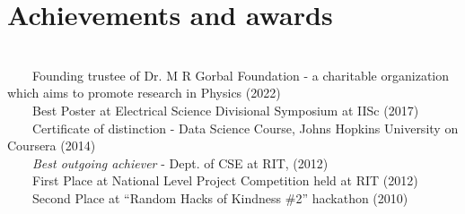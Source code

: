 \documentclass[a4paper,10pt]{article} %
\newcommand{\tabitem}{~~\llap{\textbullet}~~}
\begin{document}
\section{Achievements and awards}
~\\
\tabitem Founding trustee of Dr. M R Gorbal Foundation - a charitable organization which aims to promote research in Physics (2022) \\
\tabitem Best Poster at Electrical Science Divisional Symposium at IISc (2017)\\
\tabitem Certificate of distinction - Data Science Course, Johns Hopkins University on Coursera (2014)\\
\tabitem \textit{Best outgoing achiever} - Dept. of CSE at RIT, (2012) \\
\tabitem First Place at National Level Project Competition held at RIT (2012)\\
\tabitem Second Place at “Random Hacks of Kindness \#2” hackathon (2010)\\

\end{document}
